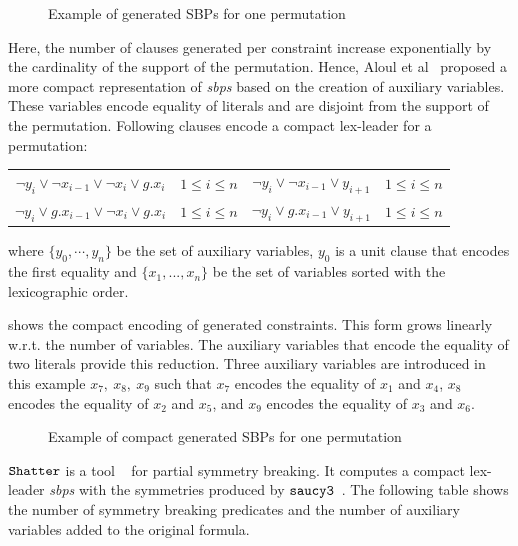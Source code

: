  \begin{figure}[!htbp]
  
  \caption{Example of generated SBPs for one permutation}
  \label{fig:esbp_gen}
 \end{figure}
Here, the number of clauses generated per constraint increase exponentially by the 
cardinality of the support  of the permutation. Hence, Aloul et al~\cite{aloul06} proposed a more compact representation of \textit{sbps} based on the creation of auxiliary variables.  
These variables encode equality of literals and are disjoint from the support of the permutation.
Following clauses encode a compact lex-leader for a permutation:
 
\begin{center}
\begin{tabular}{cc|cc}
 $\neg y_i \lor \neg x_{i-1} \lor \neg x_i \lor g.x_i$ & $1 \leq i \leq n$ & $ \neg y_i \lor \neg x_{i-1} \lor y_{i+1}$ & $1 \leq i \leq n$ \\
 $\neg y_i \lor  g.x_{i-1} \lor \neg x_i \lor g.x_i$ & $1 \leq i \leq n$ & $ \neg y_i \lor g.x_{i-1} \lor  y_{i+1}$ & $1 \leq i \leq n$ \\
 
\end{tabular}
\end{center}
where $\{y_0,\cdots, y_{n} \}$ be the set of auxiliary variables, $y_0$ is a unit clause that encodes the first equality and $\{x_1,...,x_n\}$ be the set of variables sorted with the lexicographic order.

 shows the compact encoding of generated constraints. This form grows linearly w.r.t. the number of variables.
The auxiliary variables that encode the equality of two literals provide this reduction. 
Three auxiliary variables are introduced in this example $x_7,\ x_8,\ x_9$ such that $x_7$ encodes the equality of $x_1$ and $x_4$, $x_8$ encodes the equality of $x_2$ and $x_5$, and $x_9$ encodes the equality of $x_3$ and $x_6$.
 \begin{figure}[!htbp]
 
 \caption{Example of compact generated SBPs for one permutation}
 \label{fig:esbp_compact_gen}
\end{figure}
$\texttt{Shatter}$ is a tool ~\cite{aloul06} for partial symmetry breaking.
It computes a compact lex-leader \textit{sbps} with the symmetries produced by $\texttt{saucy3}$~\cite{katebi2010symmetry}.
The following table shows the number of symmetry breaking predicates and the
number of auxiliary variables added to the original formula.

